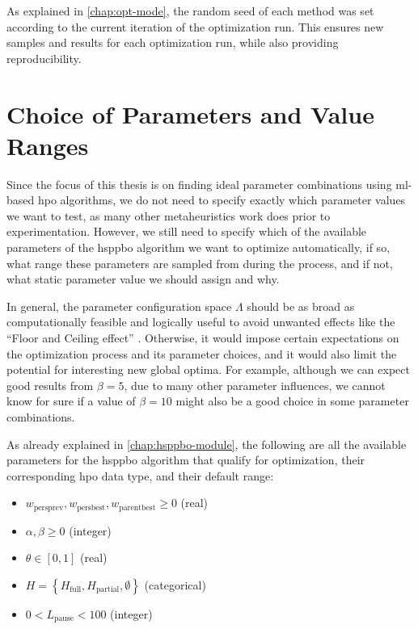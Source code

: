 As explained in \cref{chap:opt-mode}, the random seed of each method was set according to the current iteration of the optimization run. This ensures new samples and results for each optimization run, while also providing reproducibility.

\section{Choice of Parameters and Value Ranges}
\label{chap:choice-param}

Since the focus of this thesis is on finding ideal parameter combinations using \gls{ml}-based \glsdesc{hpo} algorithms, we do not need to specify exactly which parameter values we want to test, as many other metaheuristics work does prior to experimentation. However, we still need to specify which of the available parameters of the \gls{hsppbo} algorithm we want to optimize automatically, if so, what range these parameters are sampled from during the process, and if not, what static parameter value we should assign and why.

In general, the parameter configuration space $\Lambda$ should be as broad as computationally feasible and logically useful to avoid unwanted effects like the \enquote{Floor and Ceiling effect} \cite[p.~47]{vogt2011dictionary}. Otherwise, it would impose certain expectations on the optimization process and its parameter choices, and it would also limit the potential for interesting new global optima. For example, although we can expect good results from $\beta = 5$, due to many other parameter influences, we cannot know for sure if a value of $\beta = 10$ might also be a good choice in some parameter combinations.

As already explained in \cref{chap:hsppbo-module}, the following are all the available parameters for the \gls{hsppbo} algorithm that qualify for optimization, their corresponding \gls{hpo} data type, and their default range:
\begin{itemize}
	\item $w_{\text{persprev}}, w_{\text{persbest}}, w_{\text{parentbest}} \geq 0$ (real)
	\item $\alpha, \beta \geq 0$ (integer)
	\item $\theta \in [0,1]$ (real)
	\item $H = \left\lbrace H_{\text{full}}, H_{\text{partial}}, \emptyset \right\rbrace$ (categorical)
	\item $0 < L_\text{pause} < 100$ (integer)
\end{itemize}

